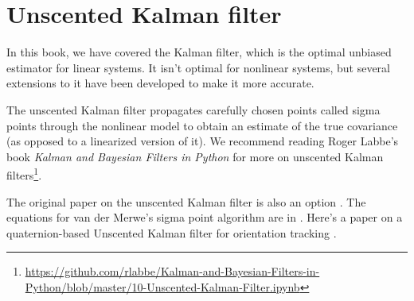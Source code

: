 \section{Unscented Kalman filter}

In this book, we have covered the Kalman filter, which is the optimal unbiased
estimator for linear \glspl{system}. It isn't optimal for nonlinear
\glspl{system}, but several extensions to it have been developed to make it more
accurate.

The unscented Kalman filter propagates carefully chosen points called sigma
points through the nonlinear model to obtain an estimate of the true covariance
(as opposed to a linearized version of it). We recommend reading Roger Labbe's
book \textit{Kalman and Bayesian Filters in Python} for more on unscented Kalman
filters\footnote{\url{https://github.com/rlabbe/Kalman-and-Bayesian-Filters-in-Python/blob/master/10-Unscented-Kalman-Filter.ipynb}}.

The original paper on the unscented Kalman filter is also an option
\cite{bib:unscented_kalman_filter}. The equations for van der Merwe's sigma
point algorithm are in \cite{bib:unscented_kalman_filter_2}. Here's a paper on a
quaternion-based Unscented Kalman filter for orientation tracking
\cite{bib:ukf_state_tracking}.
